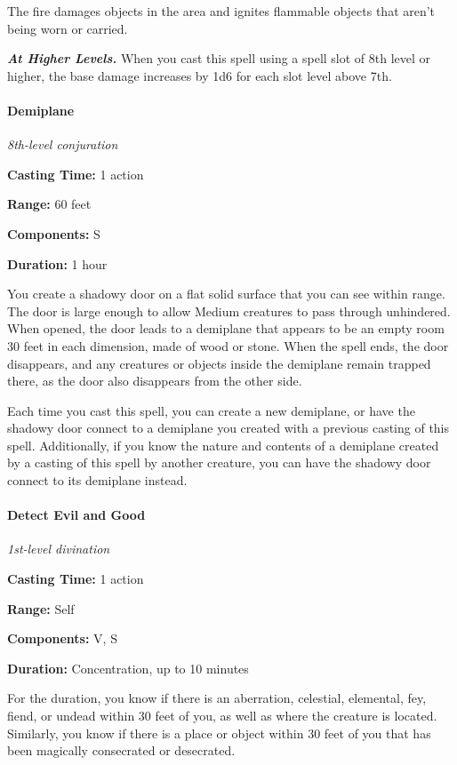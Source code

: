 \documentclass[
]{article}
\begin{document}
The fire damages objects in the area and ignites flammable objects that
aren't being worn or carried.

\emph{\textbf{At Higher Levels.}} When you cast this spell using a spell
slot of 8th level or higher, the base damage increases by 1d6 for each
slot level above 7th.

\hypertarget{demiplane}{%
\paragraph{Demiplane}\label{demiplane}}

\emph{8th-level conjuration}

\textbf{Casting Time:} 1 action

\textbf{Range:} 60 feet

\textbf{Components:} S

\textbf{Duration:} 1 hour

You create a shadowy door on a flat solid surface that you can see
within range. The door is large enough to allow Medium creatures to pass
through unhindered. When opened, the door leads to a demiplane that
appears to be an empty room 30 feet in each dimension, made of wood or
stone. When the spell ends, the door disappears, and any creatures or
objects inside the demiplane remain trapped there, as the door also
disappears from the other side.

Each time you cast this spell, you can create a new demiplane, or have
the shadowy door connect to a demiplane you created with a previous
casting of this spell. Additionally, if you know the nature and contents
of a demiplane created by a casting of this spell by another creature,
you can have the shadowy door connect to its demiplane instead.

\hypertarget{detect-evil-and-good}{%
\paragraph{Detect Evil and Good}\label{detect-evil-and-good}}

\emph{1st-level divination}

\textbf{Casting Time:} 1 action

\textbf{Range:} Self

\textbf{Components:} V, S

\textbf{Duration:} Concentration, up to 10 minutes

For the duration, you know if there is an aberration, celestial,
elemental, fey, fiend, or undead within 30 feet of you, as well as where
the creature is located. Similarly, you know if there is a place or
object within 30 feet of you that has been magically consecrated or
desecrated.
\end{document}
